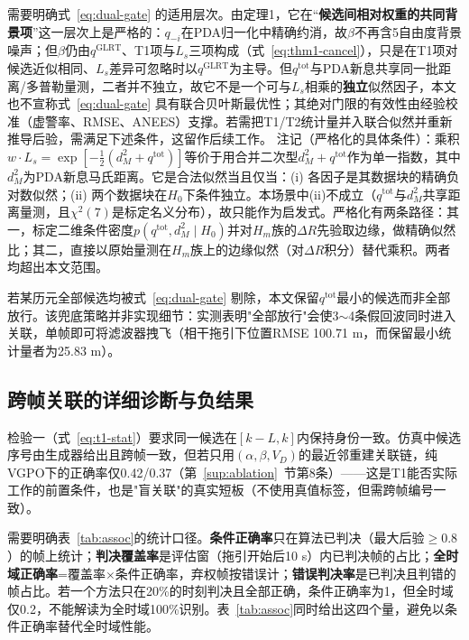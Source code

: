 \documentclass[UTF8,a4paper,zihao=-4]{ctexart}
\begin{document}
需要明确式~\eqref{eq:dual-gate} 的适用层次。由定理1，它在“\textbf{候选间相对权重的共同背景项}”这一层次上是严格的：\(q_{-i}\)在PDA归一化中精确约消，故\(\beta\)不再含5自由度背景噪声；但\(\beta\)仍由\(q^{\mathrm{GLRT}}\)、T1项与\(L_s\)三项构成（式~\eqref{eq:thm1-cancel}），只是在T1项对候选近似相同、\(L_s\)差异可忽略时以\(q^{\mathrm{GLRT}}\)为主导。但\(q^{\mathrm{tot}}\)与PDA新息共享同一批距离/多普勒量测，二者并不独立，故它不是一个可与\(L_s\)相乘的\textbf{独立}似然因子，本文也不宣称式~\eqref{eq:dual-gate} 具有联合贝叶斯最优性；其绝对门限的有效性由经验校准（虚警率、RMSE、ANEES）支撑。若需把T1/T2统计量并入联合似然并重新推导后验，需满足下述条件，这留作后续工作。
注记（严格化的具体条件）：乘积\(w\cdot L_s=\exp[-\tfrac12(d_M^2+q^{\mathrm{tot}})]\)等价于用合并二次型\(d_M^2+q^{\mathrm{tot}}\)作为单一指数，其中\(d_M^2\)为PDA新息马氏距离。它是合法似然当且仅当：(i) 各因子是其数据块的精确负对数似然；(ii) 两个数据块在\(H_0\)下条件独立。本场景中(ii)不成立（\(q^{\mathrm{tot}}\)与\(d_M^2\)共享距离量测，且\(\chi^2(7)\)是标定名义分布），故只能作为启发式。严格化有两条路径：其一，标定二维条件密度\(p(q^{\mathrm{tot}},d_M^2\mid H_0)\)并对\(H_m\)族的\(\Delta R\)先验取边缘，做精确似然比；其二，直接以原始量测在\(H_m\)族上的边缘似然（对\(\Delta R\)积分）替代乘积。两者均超出本文范围。

若某历元全部候选均被式~\eqref{eq:dual-gate} 剔除，本文保留\(q^{\mathrm{tot}}\)最小的候选而非全部放行。该兜底策略并非实现细节：实测表明"全部放行"会使3\(\sim\)4条假回波同时进入关联，单帧即可将滤波器拽飞（相干拖引下位置RMSE 100.71 m，而保留最小统计量者为25.83 m）。



\subsection{跨帧关联的详细诊断与负结果}\label{sup:association}
检验一（式~\eqref{eq:t1-stat}）要求同一候选在\([k-L,k]\)内保持身份一致。仿真中候选序号由生成器给出且跨帧一致，但若只用\((\alpha,\beta,V_D)\)的最近邻重建关联链，纯VGPO下的正确率仅0.42/0.37（第~\ref{sup:ablation}~节第8条）——这是T1能否实际工作的前置条件，也是"盲关联"的真实短板（不使用真值标签，但需跨帧编号一致）。

















需要明确表~\ref{tab:assoc}的统计口径。\textbf{条件正确率}只在算法已判决（最大后验\(\ge0.8\)）的帧上统计；\textbf{判决覆盖率}是评估窗（拖引开始后10 s）内已判决帧的占比；\textbf{全时域正确率}=覆盖率\(\times\)条件正确率，弃权帧按错误计；\textbf{错误判决率}是已判决且判错的帧占比。若一个方法只在20\%的时刻判决且全部正确，条件正确率为1，但全时域仅0.2，不能解读为全时域100\%识别。表~\ref{tab:assoc}同时给出这四个量，避免以条件正确率替代全时域性能。
\end{document}

